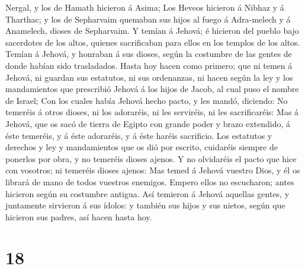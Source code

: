 Nergal, y los de Hamath hicieron á Asima;  Los Heveos
hicieron á Nibhaz y á Tharthac; y los de Sepharvaim quemaban sus hijos
al fuego á Adra-melech y á Anamelech, dioses de Sepharvaim.
 Y temían á Jehová; é hicieron del pueblo bajo sacerdotes
de los altos, quienes sacrificaban para ellos en los templos de los
altos.  Temían á Jehová, y honraban á sus dioses, según la
costumbre de las gentes de donde habían sido trasladados. 
Hasta hoy hacen como primero; que ni temen á Jehová, ni guardan sus
estatutos, ni sus ordenanzas, ni hacen según la ley y los mandamientos
que prescribió Jehová á los hijos de Jacob, al cual puso el nombre de
Israel;  Con los cuales había Jehová hecho pacto, y les
mandó, diciendo: No temeréis á otros dioses, ni los adoraréis, ni les
serviréis, ni les sacrificaréis:  Mas á Jehová, que os sacó
de tierra de Egipto con grande poder y brazo extendido, á éste temeréis,
y á éste adoraréis, y á éste haréis sacrificio.  Los
estatutos y derechos y ley y mandamientos que os dió por escrito,
cuidaréis siempre de ponerlos por obra, y no temeréis dioses ajenos.
 Y no olvidaréis el pacto que hice con vosotros; ni
temeréis dioses ajenos:  Mas temed á Jehová vuestro Dios, y
él os librará de mano de todos vuestros enemigos.  Empero
ellos no escucharon; antes hicieron según su costumbre antigua.
 Así temieron á Jehová aquellas gentes, y juntamente
sirvieron á sus ídolos: y también sus hijos y sus nietos, según que
hicieron sus padres, así hacen hasta hoy.

\hypertarget{section-17}{%
\section{18}\label{section-17}}

